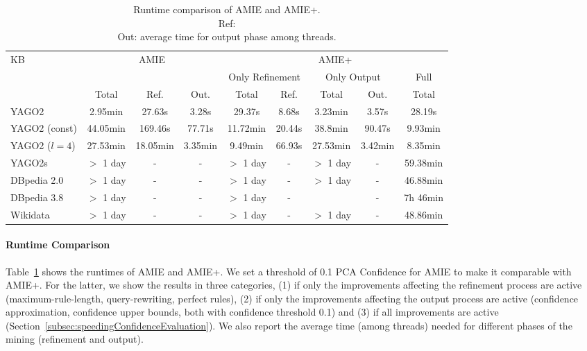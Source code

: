 \begin{center}
\begin{savenotes}
\begin{table}[t]
\footnotesize
\centering
\begin{tabular}{|l|ccc|c c|c c|c|}
\hline
\multirow{3}{*}{KB} 	&  \multicolumn{3}{c|}{AMIE}  			& \multicolumn{5}{c|}{AMIE+} 	\\ \cline{5-9}
 			& 		&		&		& \multicolumn{2}{c|}{Only Refinement}	& \multicolumn{2}{c|}{Only Output} 	&Full   \\ \cline{5-9}
			& Total		&Ref.		&Out.		&Total		&Ref.			& Total  	&Out.    	&Total 	   \\  \hline
  YAGO2  		& 2.95min  	&27.63s		&3.28s		&29.37s		&8.68s			& 3.23min 	&3.57s    	& 28.19s	  	    \\ 
  YAGO2 (const)  	& 44.05min  	&169.46s	&77.71s		&11.72min	&20.44s			& 38.8min  	&90.47s   	& 9.93min	 	    \\
  YAGO2 ($l=4$)  	& 27.53min  	&18.05min	&3.35min	&9.49min	&66.93s			& 27.53min 	&3.42min   	& 8.35min 	 	    \\
  YAGO2s  		& $>$ 1 day  	&-		&-		&$>$ 1 day	&-			&$>$ 1 day 	&-  	      	& 59.38min	  	    \\ 
  DBpedia 2.0  		& $>$ 1 day  	&-		&-		&$>$ 1 day	&-			&$>$ 1 day 	&-  	     	& 46.88min	      	    \\ 
  DBpedia 3.8  		& $>$ 1 day  	&-		&-		&$>$ 1 day	&-			&  	   	&-  	      	& 7h 46min 	     		\\
  Wikidata  		& $>$ 1 day  	&-		&-		&$>$ 1 day	&-			&$>$ 1 day 	&-  	      	& 48.86min	  	    \\ \hline
\end{tabular}
\caption{Runtime  comparison of AMIE and AMIE+.\\ Ref: \\ Out: average time for output phase among threads.}
\label{runtimeComparison}
\end{table}
\end{savenotes}
\end{center}


\paragraph{Runtime Comparison}
Table~\ref{runtimeComparison} shows the runtimes of AMIE and AMIE+. We set a threshold of 0.1 PCA Confidence for AMIE to make it
comparable with AMIE+. For the latter, we show the results in three categories, 
(1) if only the improvements affecting the refinement process are active 
(maximum-rule-length, query-rewriting, perfect rules),
(2) if only the improvements affecting the output process are active (confidence approximation, confidence upper bounds, both with confidence threshold 0.1) and
(3) if all improvements are active (Section~\ref{subsec:speedingConfidenceEvaluation}).
We also report the average time (among threads) needed for different phases of the mining (refinement and output). 

